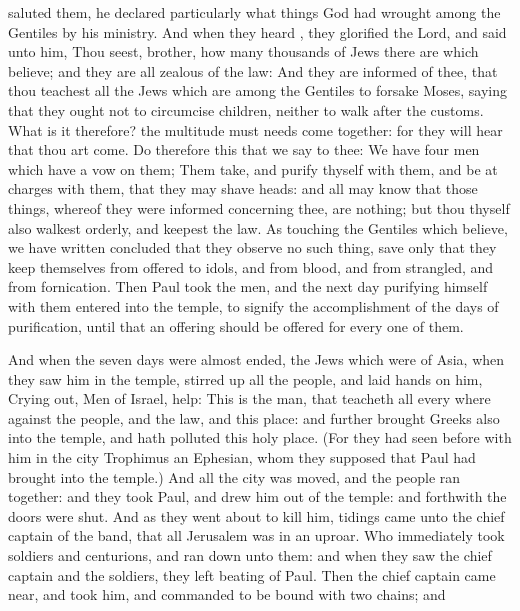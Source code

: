 {saluted
them, he
declared
particularly what
things
God had
wrought
among the
Gentiles
by
his
ministry.
And when they
heard
{}, they
glorified the
Lord,
and
said unto
him, Thou
seest,
brother, how
many
thousands of
Jews there
are
which
believe;
and they
are
all
zealous of the
law:
And they are
informed
of
thee,
that thou
teachest
all the
Jews
which are
among the
Gentiles to
forsake
Moses, saying
that
they
ought
not to
circumcise
{}
children,
neither to walk
after the
customs.
What is
it
therefore? the
multitude
must
needs come
together:
for they will
hear
that thou art
come.
Do
therefore
this that we
say to
thee:
We
have
four
men
which
have a
vow
on
them;
Them
take, and purify
thyself
with
them,
and be at
charges
with
them,
that they may
shave
{}
heads:
and
all may
know
that those
things, whereof they were
informed
concerning
thee,
are
nothing;
but
{} thou
thyself
also walkest
orderly, and
keepest the
law.
As
touching the
Gentiles
which
believe,
we have
written
{} concluded
that
they
observe
no such
thing,
save only
that they
keep
themselves
from
{} offered to
idols,
and from
blood,
and from
strangled,
and from
fornication.
Then
Paul
took the
men, and the
next
day purifying
himself
with
them
entered
into the
temple, to
signify the
accomplishment of the
days of
purification,
until
that an offering should
be
offered
for
every
one of
them.
\par }{\PP {}And
when the
seven
days were
almost
ended, the
Jews which
were
of
Asia, when they
saw
him
in the
temple, stirred
up
all the
people,
and
laid
hands
on
him,
Crying
out,
Men of
Israel,
help:
This
is the
man, that
teacheth
all
{} every
where
against the
people,
and the
law,
and
this
place:
and
further
brought
Greeks
also
into the
temple,
and hath
polluted
this
holy
place.
(For they
had seen
before
with
him
in the
city
Trophimus an
Ephesian,
whom they
supposed
that
Paul had
brought
into the
temple.)
And
all the
city
was
moved,
and the
people ran
together:
and they
took
Paul, and
drew
him out
of the
temple:
and
forthwith the
doors were
shut.
And as they went
about to
kill
him,
tidings came
unto the chief
captain of the
band,
that
all
Jerusalem was in an
uproar.
Who
immediately
took
soldiers
and
centurions, and ran
down
unto
them:
and when they
saw the chief
captain
and the
soldiers, they
left
beating of
Paul.
Then the chief
captain came
near, and
took
him,
and
commanded
{} to be
bound with
two
chains;
and
}
